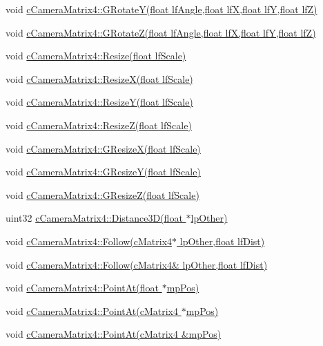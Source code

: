  void \hyperlink{classc_camera_matrix4_a775326e51bf492340e8768d219a4e5e2}{cCameraMatrix4::GRotateY(float lfAngle,float lfX,float lfY,float lfZ)} \par
 void \hyperlink{classc_camera_matrix4_a8c99ce20f8594e9a66e0a7b2830ec9e9}{cCameraMatrix4::GRotateZ(float lfAngle,float lfX,float lfY,float lfZ)} \par
 \par
 void \hyperlink{classc_camera_matrix4_a620ba52edfd711f011d43a441eece9bc}{cCameraMatrix4::Resize(float lfScale)} \par
 void \hyperlink{classc_camera_matrix4_ab5ec9054a71a9df7bb671829875600f2}{cCameraMatrix4::ResizeX(float lfScale)} \par
 void \hyperlink{classc_camera_matrix4_a44507dbaa203a79c420d9ceef985e186}{cCameraMatrix4::ResizeY(float lfScale)} \par
 void \hyperlink{classc_camera_matrix4_a6c4d89f66c5b6568b5f334c3ab4a7414}{cCameraMatrix4::ResizeZ(float lfScale)} \par
 \par
 void \hyperlink{classc_camera_matrix4_a9984a8427cd90e77a2fb6462ecf99ecc}{cCameraMatrix4::GResizeX(float lfScale)} \par
 void \hyperlink{classc_camera_matrix4_aa2a9326b7f2a6f00aa5b45057c69ecd3}{cCameraMatrix4::GResizeY(float lfScale)} \par
 void \hyperlink{classc_camera_matrix4_a1ab7808cf06ddf7ec373b926c77f85c6}{cCameraMatrix4::GResizeZ(float lfScale)} \par
 \par
 uint32 \hyperlink{classc_camera_matrix4_adf5481b8c761008b9611e0b071e70914}{cCameraMatrix4::Distance3D(float $\ast$lpOther)} \par
 \par
 void \hyperlink{classc_camera_matrix4_aeee787e0f5895a613e8be9efbade408f}{cCameraMatrix4::Follow(cMatrix4$\ast$ lpOther,float lfDist)} \par
 void \hyperlink{classc_camera_matrix4_a0bb6a232830c5e5571677b048cc1c45d}{cCameraMatrix4::Follow(cMatrix4\& lpOther,float lfDist)} \par
 void \hyperlink{classc_camera_matrix4_aa8ca47d59f6b3b454d700329bdbbdeea}{cCameraMatrix4::PointAt(float $\ast$mpPos)} \par
 void \hyperlink{classc_camera_matrix4_af4d7a8a24ba247bbd035e22ef609981c}{cCameraMatrix4::PointAt(cMatrix4 $\ast$mpPos)} \par
 void \hyperlink{classc_camera_matrix4_aa4cd6a1c22791a336c3eb21d0a0d94e4}{cCameraMatrix4::PointAt(cMatrix4 \&mpPos)} \par
